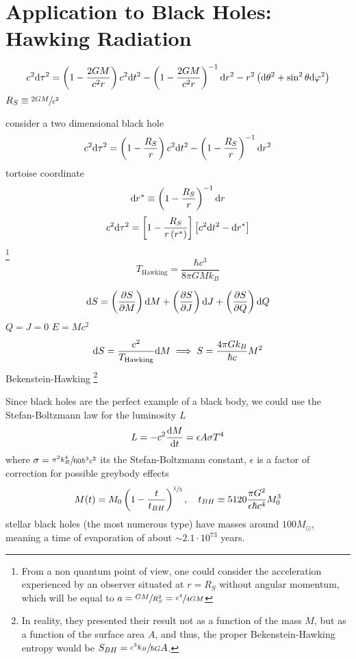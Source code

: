 \section{Application to Black Holes: Hawking Radiation}
\begin{equation}
	c^2\text{d}\tau^2=\left(1-\frac{2GM}{c^2r}\right)c^2\text{d} t^2-\left(1-\frac{2GM}{c^2r}\right)^{-1}\text{d} r^2-r^2\left(\text{d}\theta^2+\sin^2\theta\text{d}\varphi^2\right)
\end{equation}
$R_S\equiv\sfrac{2GM}{c^2}$

consider a two dimensional black hole
\begin{equation}
	c^2\text{d}\tau^2=\left(1-\frac{R_S}{r}\right)c^2\text{d} t^2-\left(1-\frac{R_S}{r}\right)^{-1}\text{d} r^2
\end{equation}
tortoise coordinate
\begin{equation}
	\text{d} r^*\equiv \left(1-\frac{R_S}{r}\right)^{-1}\text{d} r
\end{equation}
\begin{equation}
	c^2\text{d}\tau^2=\left[1-\frac{R_S}{r\left(r^*\right)}\right]\left[c^2\text{d} t^2-\text{d} r^*\right]
\end{equation}
\footnote{From a non quantum point of view, one could consider the acceleration experienced by an observer situated at $r=R_S$ without angular momentum, which will be equal to $a=\sfrac{GM}{R_S^2}=\sfrac{c^4}{4GM}$}
\begin{equation}
	T_{\text{Hawking}}=\frac{\hbar c^3}{8\pi GMk_B}
\end{equation}

\begin{equation}
	\text{d} S=\left(\frac{\partial S}{\partial M}\right)\text{d} M+\left(\frac{\partial S}{\partial J}\right)\text{d} J+\left(\frac{\partial S}{\partial Q}\right)\text{d} Q
\end{equation}
$Q=J=0$ $E=Mc^2$
\begin{equation}
	\text{d} S=\frac{c^2}{T_{\text{Hawking}}}\text{d} M\implies S=\frac{4\pi Gk_B}{\hbar c}M^2
\end{equation}
Bekenstein-Hawking \footnote{In reality, they presented their result not as a function of the mass $M$, but as a function of the surface area $A$, and thus, the proper Bekenstein-Hawking entropy would be $S_{BH}=\sfrac{c^3k_B}{\hbar G}A$.}

Since black holes are the perfect example of a black body, we could use the Stefan-Boltzmann law for the luminosity $L$
\begin{equation}
	L=-c^2\frac{\text{d} M}{\text{d} t}=\epsilon A \sigma T^4
\end{equation}
where $\sigma=\sfrac{\pi^2 k_B^4}{60\hbar^3c^2}$ its the Stefan-Boltzmann constant, $\epsilon$ is a factor of correction for possible greybody effects
\begin{equation}
	M(t)=M_0\left(1-\frac{t}{t_{BH}}\right)^{\sfrac{1}{3}},\quad t_{BH}\equiv 5120\frac{\pi G^2}{\epsilon\hbar c^4}M_0^3
\end{equation}
stellar black holes (the most numerous type) have masses around $100M_\odot$, meaning a time of evaporation of about $\sim 2.1\cdot10^{73}$ years.
